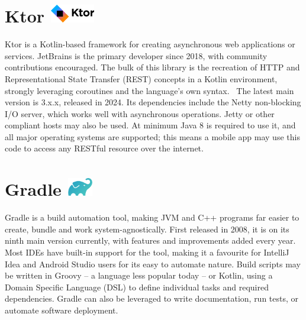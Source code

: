 \section{Ktor {\hspace{1cm}\includegraphics[height=8mm, keepaspectratio]{images/ktor_logo.png}}}

Ktor is a Kotlin-based framework for creating asynchronous web applications or services. JetBrains is the primary developer since 2018, with community contributions encouraged. The bulk of this library is the recreation of HTTP and Representational State Transfer (REST) concepts in a Kotlin environment, strongly leveraging coroutines and the language's own syntax.~\cite{KtorDocs} The latest main version is 3.x.x, released in 2024. Its dependencies include the Netty non-blocking I/O server, which works well with asynchronous operations. Jetty or other compliant hosts may also be used. At minimum Java 8 is required to use it, and all major operating systems are supported; this means a mobile app may use this code to access any RESTful resource over the internet.

\section{Gradle {\hspace{1cm}\includegraphics[height=8mm, keepaspectratio]{images/gradle_logo.png}}}

Gradle is a build automation tool, making JVM and C++ programs far easier to create, bundle and work system-agnostically.\cite{GradleDocs} First released in 2008, it is on its ninth main version currently, with features and improvements added every year. Most IDEs have built-in support for the tool, making it a favourite for IntelliJ Idea and Android Studio users for its easy to automate nature. Build scripts may be written in Groovy -- a language less popular today -- or Kotlin, using a Domain Specific Language (DSL) to define individual tasks and required dependencies. Gradle can also be leveraged to write documentation, run tests, or automate software deployment.
